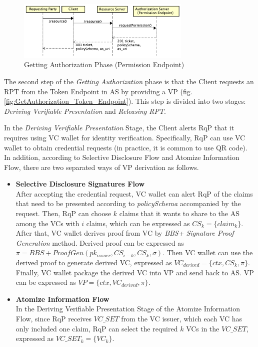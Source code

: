 \documentclass[conference, dvipdfmx]{IEEEtran} %
\begin{document}
\begin{sloppypar}
\begin{figure}[htbp] %
  \begin{center} %
  \includegraphics[width=83mm]{images/GetAuthorization_Permission_Endpoint.png} %
  \caption{Getting Authorization Phase (Permission Endpoint)} %
  \label{fig:GetAuthorization_Permission_Endpoint} %
  \end{center}
\end{figure}

The second step of the \textit{Getting Authorization} phase is that the Client requests an RPT from the Token Endpoint in AS by providing a VP (fig. \ref{fig:GetAuthorization_Token_Endpoint}). This step is divided into two stages: \textit{Deriving Verifiable Presentation} and \textit{Releasing RPT}.

In the \textit{Deriving Verifiable Presentation} Stage, the Client alerts RqP that it requires using VC wallet for identity verification. Specifically, RqP can use VC wallet to obtain credential requests (in practice, it is common to use QR code). 
In addition, according to Selective Disclosure Flow and Atomize Information Flow, there are two separated ways of VP derivation as follows. 

\begin{itemize}
  \item \textbf{Selective Disclosure Signatures Flow}\\
  After accepting the credential request,  VC wallet can alert RqP of the claims that need to be presented according to \textit{policySchema} accompanied by the request.
  Then, RqP can choose $k$ claims that it wants to share to the AS  among the VCs with $i$ claims, which can be expressed as $CS_k = \{claim_k\}$. 
  After that, VC wallet derives proof from VC by \textit{BBS+ Signature Proof Generation} method. Derived proof can be expressed as $\pi = BBS+ ProofGen(pk_{issuer}, CS_{i-k}, CS_k, \sigma)$. Then VC wallet can use the derived proof to generate derived VC, expressed as $VC_{derived} = \{ctx, CS_k, \pi\}$. Finally, VC wallet package the derived VC into VP and send back to AS. VP can be expressed as $VP=\{ctx, VC_{derived}, \pi\}$.
  \item \textbf{Atomize Information Flow} \\
  In the Deriving Verifiable Presentation Stage of the Atomize Information Flow, since RqP receives $VC\_SET$ from the VC issuer, which each VC has only included one claim, RqP can select the required $k$ VCs in the $VC\_SET$, expressed as $VC\_SET_k=\{VC_k\}$.
\end{itemize}


\end{sloppypar}
\end{document}
